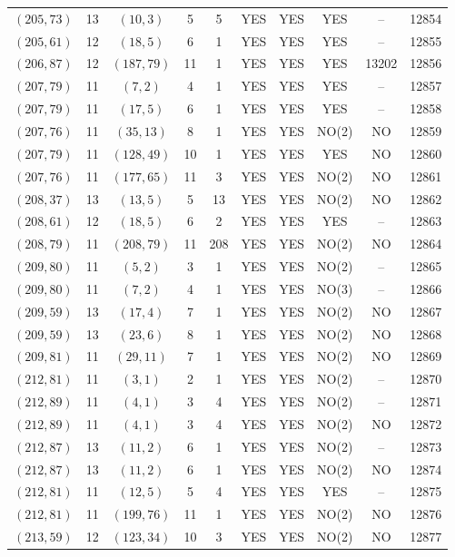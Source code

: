 \begin{longtable}{|c|c|c|c|c|c|c|c|c|c|}
$(205, 73)$ & 13 & $(10, 3)$ & 5 & 5 & YES & YES & YES & -- & 12854\\
$(205, 61)$ & 12 & $(18, 5)$ & 6 & 1 & YES & YES & YES & -- & 12855\\
$(206, 87)$ & 12 & $(187, 79)$ & 11 & 1 & YES & YES & YES & 13202 & 12856\\
$(207, 79)$ & 11 & $(7, 2)$ & 4 & 1 & YES & YES & YES & -- & 12857\\
$(207, 79)$ & 11 & $(17, 5)$ & 6 & 1 & YES & YES & YES & -- & 12858\\
$(207, 76)$ & 11 & $(35, 13)$ & 8 & 1 & YES & YES & NO(2) & NO & 12859\\
$(207, 79)$ & 11 & $(128, 49)$ & 10 & 1 & YES & YES & YES & NO & 12860\\
$(207, 76)$ & 11 & $(177, 65)$ & 11 & 3 & YES & YES & NO(2) & NO & 12861\\
$(208, 37)$ & 13 & $(13, 5)$ & 5 & 13 & YES & YES & NO(2) & NO & 12862\\
$(208, 61)$ & 12 & $(18, 5)$ & 6 & 2 & YES & YES & YES & -- & 12863\\
$(208, 79)$ & 11 & $(208, 79)$ & 11 & 208 & YES & YES & NO(2) & NO & 12864\\
$(209, 80)$ & 11 & $(5, 2)$ & 3 & 1 & YES & YES & NO(2) & -- & 12865\\
$(209, 80)$ & 11 & $(7, 2)$ & 4 & 1 & YES & YES & NO(3) & -- & 12866\\
$(209, 59)$ & 13 & $(17, 4)$ & 7 & 1 & YES & YES & NO(2) & NO & 12867\\
$(209, 59)$ & 13 & $(23, 6)$ & 8 & 1 & YES & YES & NO(2) & NO & 12868\\
$(209, 81)$ & 11 & $(29, 11)$ & 7 & 1 & YES & YES & NO(2) & NO & 12869\\
$(212, 81)$ & 11 & $(3, 1)$ & 2 & 1 & YES & YES & NO(2) & -- & 12870\\
$(212, 89)$ & 11 & $(4, 1)$ & 3 & 4 & YES & YES & NO(2) & -- & 12871\\
$(212, 89)$ & 11 & $(4, 1)$ & 3 & 4 & YES & YES & NO(2) & NO & 12872\\
$(212, 87)$ & 13 & $(11, 2)$ & 6 & 1 & YES & YES & NO(2) & -- & 12873\\
$(212, 87)$ & 13 & $(11, 2)$ & 6 & 1 & YES & YES & NO(2) & NO & 12874\\
$(212, 81)$ & 11 & $(12, 5)$ & 5 & 4 & YES & YES & YES & -- & 12875\\
$(212, 81)$ & 11 & $(199, 76)$ & 11 & 1 & YES & YES & NO(2) & NO & 12876\\
$(213, 59)$ & 12 & $(123, 34)$ & 10 & 3 & YES & YES & NO(2) & NO & 12877\\

\end{longtable}
